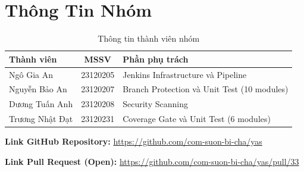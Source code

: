\section{Thông Tin Nhóm}

\begin{table}[H]
\centering
\caption{Thông tin thành viên nhóm}
\begin{tabular}{|l|c|l|}
\hline
\textbf{Thành viên} & \textbf{MSSV} & \textbf{Phần phụ trách} \\
\hline
Ngô Gia An & 23120205 & Jenkins Infrastructure và Pipeline \\
\hline
Nguyễn Bảo An & 23120207 & Branch Protection và Unit Test (10 modules) \\
\hline
Dương Tuấn Anh & 23120208 & Security Scanning \\
\hline
Trương Nhật Đạt & 23120231 & Coverage Gate và Unit Test (6 modules) \\
\hline
\end{tabular}
\end{table}

\textbf{Link GitHub Repository:} \url{https://github.com/com-suon-bi-cha/yas}

\textbf{Link Pull Request (Open):} \url{https://github.com/com-suon-bi-cha/yas/pull/33}

